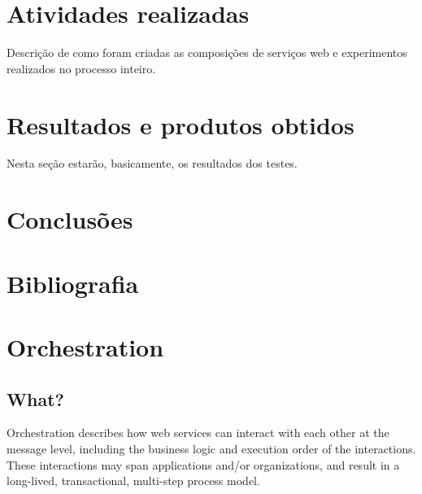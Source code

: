 \documentclass[11pt,a4paper]{article}
\begin{document}
\section{Atividades realizadas}
Descrição de como foram criadas as composições de serviços web e experimentos realizados no processo inteiro.



\section{Resultados e produtos obtidos}
Nesta seção estarão, basicamente, os resultados dos testes.




\section{Conclusões}




 
\section{Bibliografia}

































\section{Orchestration}
\subsection{What?}
Orchestration describes how web services can interact with each other at the message level, including the business logic and execution order of the interactions. These interactions may span applications and/or organizations, and result in a long-lived, transactional, multi-step process model.
\end{document}
